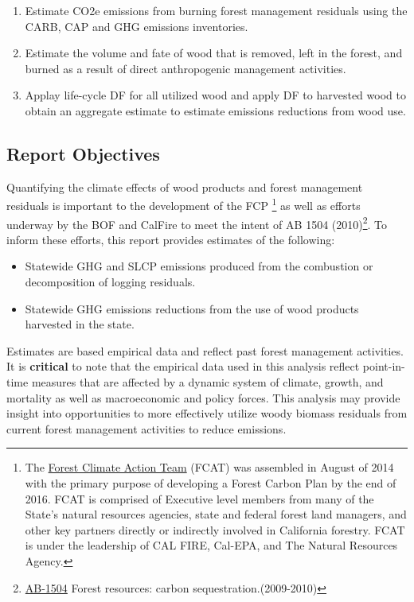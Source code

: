 \documentclass[a4paper]{article}
\begin{document}
\begin{enumerate}
\item Estimate \ac{CO2e} emissions from burning forest management
residuals using the \ac{CARB}, \ac{CAP} and \ac{GHG} emissions inventories.

\item Estimate the volume and fate of wood that is removed, left in the
forest, and burned as a result of direct anthropogenic management
activities.

\item Applay life-cycle \ac{DF} for all utilized wood and apply \ac{DF} to harvested wood to obtain an aggregate estimate to estimate emissions reductions from wood use.
\end{enumerate}

\subsection{Report Objectives}
\label{sec:orgheadline1}

Quantifying the climate effects of wood products and forest management
residuals is important to the development of the \ac{FCP} \footnote{The \href{http://www.fire.ca.gov/fcat/}{Forest Climate Action Team} (FCAT) was assembled in August of 2014 with the primary purpose of developing a Forest Carbon Plan by the end of 2016. FCAT is comprised of Executive level members from many of the State’s natural resources agencies, state and federal forest land managers, and other key partners directly or indirectly involved in California forestry. FCAT is under the leadership of CAL FIRE, Cal-EPA, and The Natural Resources Agency.} as well as efforts underway by the \ac{BOF} and CalFire to meet the intent of AB 1504 (2010)\footnote{\href{http://leginfo.legislature.ca.gov/faces/billTextClient.xhtml?bill_id=200920100AB1504}{AB-1504} Forest resources: carbon sequestration.(2009-2010)}. To
inform these efforts, this report provides estimates of the following:

\begin{itemize}
\item Statewide \ac{GHG} and \ac{SLCP} emissions produced from the combustion or
decomposition of logging residuals.
\item Statewide \ac{GHG} emissions reductions from the use of wood products harvested in
the state.
\end{itemize}


Estimates are based empirical data and reflect past forest
management activities. It is \textbf{critical} to note that the empirical
data used in this analysis reflect point-in-time measures that are
affected by a dynamic system of climate, growth, and mortality as well as macroeconomic and policy forces. This analysis may provide insight into
opportunities to more effectively utilize woody biomass residuals from
current forest management activities to reduce emissions. 
\end{document}
